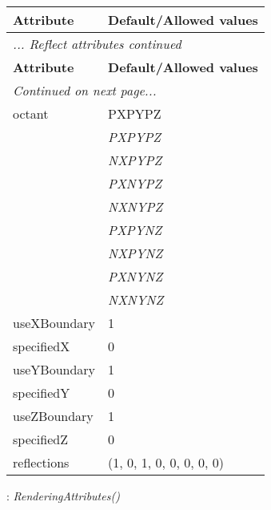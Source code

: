 \documentclass[10pt,a4paper]{report}
\begin{document}
\begin{longtable}{ll}
{\bf Attribute} & {\bf Default/Allowed values} \\
\hline \hline
\endfirsthead
\multicolumn{2}{l}{{\it ... Reflect attributes continued}} \\
{\bf Attribute} & {\bf Default/Allowed values} \\
\hline \hline
\endhead
\hline
\multicolumn{2}{l}{{\it Continued on next page...}} \\
\endfoot
\hline
\endlastfoot

octant  &  PXPYPZ   \\
 & {\it  PXPYPZ} \\
 & {\it  NXPYPZ} \\
 & {\it  PXNYPZ} \\
 & {\it  NXNYPZ} \\
 & {\it  PXPYNZ} \\
 & {\it  NXPYNZ} \\
 & {\it  PXNYNZ} \\
 & {\it  NXNYNZ} \\
useXBoundary  &  1 \\
specifiedX  &  0 \\
useYBoundary  &  1 \\
specifiedY  &  0 \\
useZBoundary  &  1 \\
specifiedZ  &  0 \\
reflections  &  (1, 0, 1, 0, 0, 0, 0, 0) \\
\end{longtable}

\newpage

{}
: {\it RenderingAttributes() }\\[-3mm]
\end{document}
